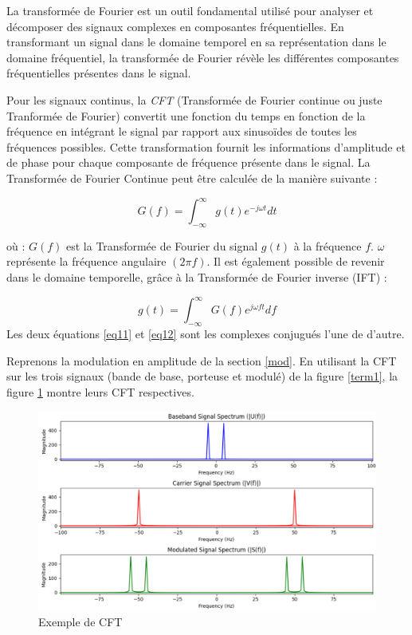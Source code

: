 \vspace{0.1cm}

La transformée de Fourier est un outil fondamental utilisé pour analyser et décomposer des signaux complexes en composantes fréquentielles. En transformant un signal dans le domaine temporel en sa représentation dans le domaine fréquentiel, la transformée de Fourier révèle les différentes composantes fréquentielles présentes dans le signal.

\vspace{0.1cm}

Pour les signaux continus, la \textit{CFT} (Transformée de Fourier continue ou juste Tranformée de Fourier) convertit une fonction du temps en fonction de la fréquence en intégrant le signal par rapport aux sinusoïdes de toutes les fréquences possibles. Cette transformation fournit les informations d'amplitude et de phase pour chaque composante de fréquence présente dans le signal. La Transformée de Fourier Continue peut être calculée de la manière suivante :  

\begin{equation}\label{eq11}
G(f) = \int_{-\infty}^{\infty} g(t)e^{-j\omega t} dt
\end{equation}

où : $G(f)$ est la Transformée de Fourier du signal $g(t)$ à la fréquence $f$. $\omega$ représente la fréquence angulaire $(2 \pi f)$.
Il est également possible de revenir dans le domaine temporelle, grâce à la Transformée de Fourier inverse (IFT) :

\begin{equation}\label{eq12}
g(t) = \int_{-\infty}^{\infty} G(f)e^{j\omega ft} df
\end{equation}
Les deux équations \ref{eq11} et \ref{eq12} sont les complexes conjugués l'une de d'autre.

\vspace{0.1cm}

Reprenons la modulation en amplitude de la section \ref{mod}. En utilisant la CFT sur les trois signaux (bande de base, porteuse et modulé) de la figure \ref{term1}, la figure \ref{term8} montre leurs CFT respectives.

\begin{figure}[h]
\centering

\includegraphics[scale=0.5]{images/CFT.PNG}
\caption{Exemple de CFT}\label{term8}
\end{figure}

